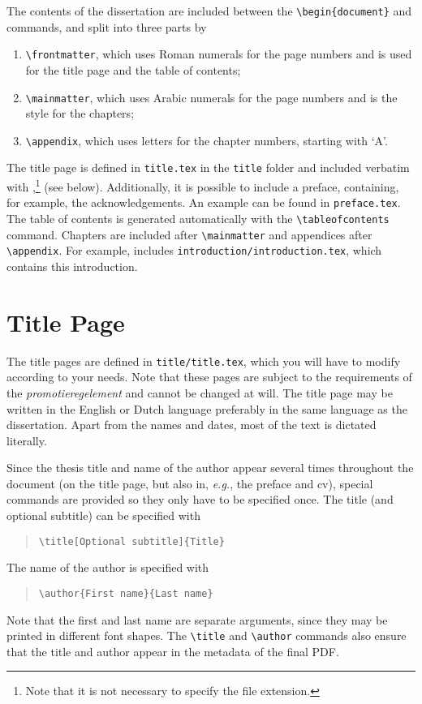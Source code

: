\begin{refsection}
The contents of the dissertation are included between the \verb|\begin|\allowbreak\verb|{document}| and \verb|| commands, and split into three parts by
\begin{enumerate}
\item\verb|\frontmatter|, which uses Roman numerals for the page numbers and is used for the title page and the table of contents;
\item\verb|\mainmatter|, which uses Arabic numerals for the page numbers and is the style for the chapters;
\item\verb|\appendix|, which uses letters for the chapter numbers, starting with `A'.
\end{enumerate}
The title page is defined in \texttt{title.tex} in the \texttt{title} folder and included verbatim with \verb||,\footnote{Note that it is not necessary to specify the file extension.} (see below). Additionally, it is possible to include a preface, containing, for example, the acknowledgements. An example can be found in \texttt{preface.tex}. The table of contents is generated automatically with the \verb|\tableofcontents| command. Chapters are included after \verb|\mainmatter| and appendices after \verb|\appendix|. For example, \verb|| includes \verb|introduction/introduction.tex|, which contains this introduction.

\section{Title Page}

\dropcap T{he} title pages are defined in \texttt{title/title.tex}, which you will have to modify according to your needs. Note that these pages are subject to the requirements of the \emph{promotieregelement} and cannot be changed at will. The title page may be written in the English or Dutch language
preferably in the same language as the dissertation.
Apart from the names and dates, most of the text is dictated literally.

Since the thesis title and name of the author appear several times throughout the document (on the title page, but also in, \emph{e.g.}, the preface and cv), special commands are provided so they only have to be specified once. The title (and optional subtitle) can be specified with

\begin{quote}
\verb|\title[Optional subtitle]{Title}|
\end{quote}
The name of the author is specified with
\begin{quote}
\verb|\author{First name}{Last name}|
\end{quote}
Note that the first and last name are separate arguments, since they may be printed in different font shapes. The \verb|\title| and \verb|\author| commands also ensure that the title and author appear in the metadata of the final PDF.


\end{refsection}
